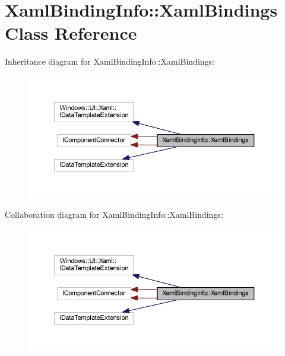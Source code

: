 \hypertarget{class_xaml_binding_info_1_1_xaml_bindings}{}\section{Xaml\+Binding\+Info\+:\+:Xaml\+Bindings Class Reference}
\label{class_xaml_binding_info_1_1_xaml_bindings}


Inheritance diagram for Xaml\+Binding\+Info\+:\+:Xaml\+Bindings\+:\nopagebreak
\begin{figure}[H]
\begin{center}
\leavevmode
\includegraphics[width=350pt]{class_xaml_binding_info_1_1_xaml_bindings__inherit__graph}
\end{center}
\end{figure}


Collaboration diagram for Xaml\+Binding\+Info\+:\+:Xaml\+Bindings\+:\nopagebreak
\begin{figure}[H]
\begin{center}
\leavevmode
\includegraphics[width=350pt]{class_xaml_binding_info_1_1_xaml_bindings__coll__graph}
\end{center}
\end{figure}
